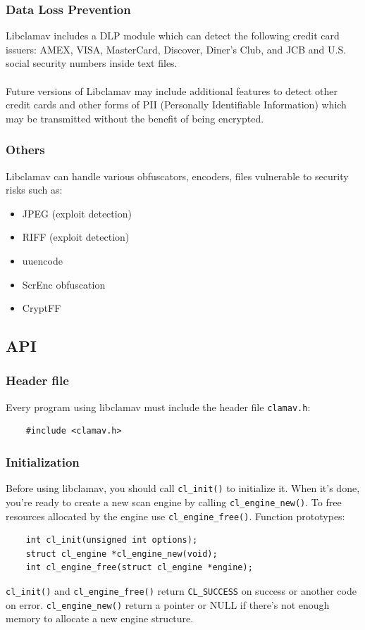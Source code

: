 \documentclass[a4paper,titlepage,12pt]{article}
\begin{document}
    \subsubsection{Data Loss Prevention}
    Libclamav includes a DLP module which can detect the following
    credit card issuers: AMEX, VISA, MasterCard, Discover, Diner's Club,
    and JCB and U.S. social security numbers inside text files.
    \\\\
    Future versions of Libclamav may include additional features to
    detect other credit cards and other forms of PII (Personally
    Identifiable Information) which may be transmitted without the
    benefit of being encrypted.

    \subsubsection{Others}
    Libclamav can handle various obfuscators, encoders, files vulnerable to
    security risks such as:
    \begin{itemize}
	\item JPEG (exploit detection)
	\item RIFF (exploit detection)
	\item uuencode
	\item ScrEnc obfuscation
	\item CryptFF
    \end{itemize}

    \subsection{API}

    \subsubsection{Header file}
    Every program using libclamav must include the header file \verb+clamav.h+:
    \begin{verbatim}
	#include <clamav.h>
    \end{verbatim}

    \subsubsection{Initialization}
    Before using libclamav, you should call \verb+cl_init()+ to initialize
    it. When it's done, you're ready to create a new scan engine by calling
    \verb+cl_engine_new()+. To free resources allocated by the engine use
    \verb+cl_engine_free()+. Function prototypes:
    \begin{verbatim}
	int cl_init(unsigned int options);
	struct cl_engine *cl_engine_new(void);
	int cl_engine_free(struct cl_engine *engine);
    \end{verbatim}
    \verb+cl_init()+ and \verb+cl_engine_free()+ return \verb+CL_SUCCESS+
    on success or another code on error. \verb+cl_engine_new()+ return
    a pointer or NULL if there's not enough memory to allocate a new
    engine structure.
\end{document}
